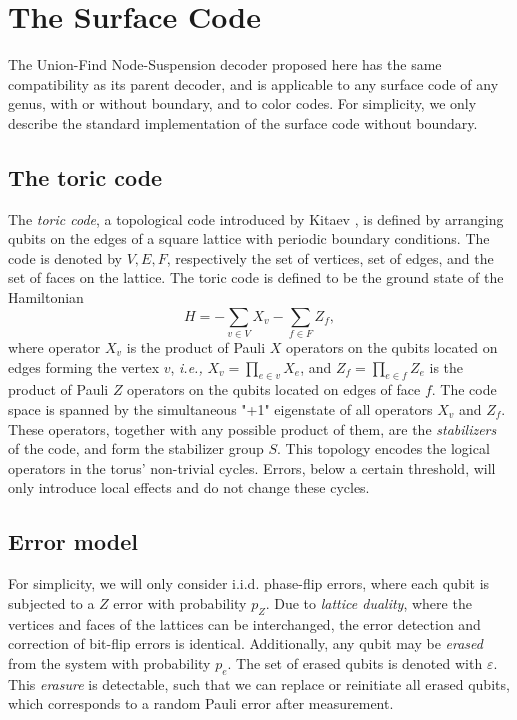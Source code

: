 \section{The Surface Code}\label{sec:surfacecode}

The Union-Find Node-Suspension decoder proposed here has the same compatibility as its parent decoder, and is applicable to any surface code of any genus, with or without boundary, and to color codes. For simplicity, we only describe the standard implementation of the surface code without boundary.

\subsection{The toric code}

The \emph{toric code}, a topological code introduced by Kitaev \cite{kitaev2003fault}, is defined by arranging qubits on the edges of a square lattice with periodic boundary conditions. The code is denoted by $V,E,F$, respectively the set of vertices, set of edges, and the set of faces on the lattice. The toric code is defined to be the ground state of the Hamiltonian 
\begin{equation}
    H = -\sum_{v \in V} X_v -\sum_{f \in F} Z_f, 
\end{equation}
where operator $X_v$ is the product of Pauli $X$ operators on the qubits located on edges forming the vertex $v$, \emph{i.e.,} $X_v = \prod_{e \in v} X_e$, and $Z_f = \prod_{e \in f} Z_e$ is the product of Pauli $Z$ operators on the qubits located on edges of face $f$. The code space is spanned by the simultaneous "+1" eigenstate of all operators $X_v$ and $Z_f$. These operators, together with any possible product of them, are the \emph{stabilizers} of the code, and form the stabilizer group $S$. This topology encodes the logical operators in the torus' non-trivial cycles. Errors, below a certain threshold, will only introduce local effects and do not change these cycles.

\subsection{Error model}
For simplicity, we will only consider i.i.d. phase-flip errors, where each qubit is subjected to a $Z$ error with probability $p_Z$. Due to \emph{lattice duality}, where the vertices and faces of the lattices can be interchanged, the error detection and correction of bit-flip errors is identical. 
Additionally, any qubit may be \emph{erased} from the system with probability $p_e$. The set of erased qubits is denoted with $\varepsilon$. This \emph{erasure} is detectable, such that we can replace or reinitiate all erased qubits, which corresponds to a random Pauli error after measurement. 

